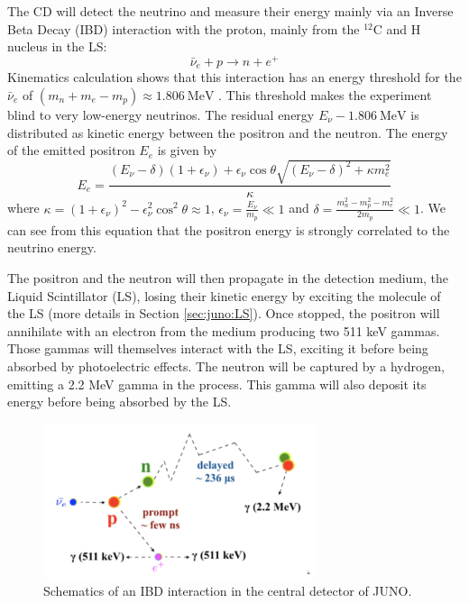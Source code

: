 \documentclass[../main.tex]{subfiles}
\begin{document}
The CD will detect the neutrino and measure their energy mainly via an Inverse Beta Decay (IBD) interaction with the proton, mainly from the $^{12}$C and H nucleus in the LS:
\begin{equation*}
  \bar{\nu}_e + p \rightarrow n + e^+
\end{equation*}
Kinematics calculation shows that this interaction has an energy threshold for the $\bar{\nu}_e$ of $ (m_n + m_e - m_p ) \approx 1.806 ~ \mathrm{MeV}$ \cite{strumia_precise_2003}.
This threshold makes the experiment blind to very low-energy neutrinos. The residual energy $E_{\nu} - 1.806 ~ \mathrm{MeV}$ is distributed as kinetic energy between the positron and the neutron.
The energy of the emitted positron $E_e$ is given by \cite{strumia_precise_2003}
\begin{equation}
  E_e = \frac{(E_\nu - \delta)(1+\epsilon_\nu) + \epsilon_\nu \cos \theta \sqrt{(E_\nu - \delta)^2 + \kappa m_e^2}}{\kappa}
\end{equation}
where $\kappa = (1 + \epsilon_\nu)^2 - \epsilon_\nu^2 \cos^2 \theta \approx 1$, $\epsilon_\nu = \frac{E_\nu}{m_p} \ll 1$ and $\delta = \frac{m_n^2 - m_p^2 - m_e^2}{2m_p} \ll 1$.
We can see from this equation that the positron energy is strongly correlated to the neutrino energy.


The positron and the neutron will then propagate in the detection medium, the Liquid Scintillator (LS), losing their kinetic energy by exciting the molecule of the LS (more details in Section \ref{sec:juno:LS}). Once stopped, the positron will annihilate with an electron from the medium producing two 511 keV gammas. Those gammas will themselves interact with the LS, exciting it before being absorbed by photoelectric effects. The neutron will be captured by a hydrogen, emitting a 2.2 MeV gamma in the process. This gamma will also deposit its energy before being absorbed by the LS.

\begin{figure}[ht]
  \centering
  \includegraphics[width=8cm]{images/juno/IDB-JUNO.png}
  \caption{Schematics of an IBD interaction in the central detector of JUNO.}
  \label{fig:juno:IBD}
\end{figure}
\end{document}
